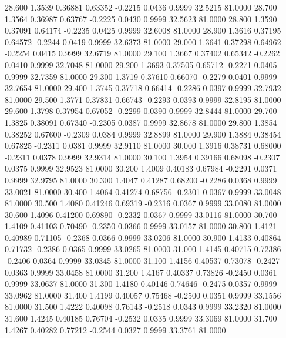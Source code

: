   28.600   1.3539   0.36881   0.63352  -0.2215   0.0436   0.9999  32.5215  81.0000
  28.700   1.3564   0.36987   0.63767  -0.2225   0.0430   0.9999  32.5623  81.0000
  28.800   1.3590   0.37091   0.64174  -0.2235   0.0425   0.9999  32.6008  81.0000
  28.900   1.3616   0.37195   0.64572  -0.2244   0.0419   0.9999  32.6373  81.0000
  29.000   1.3641   0.37298   0.64962  -0.2254   0.0415   0.9999  32.6719  81.0000
  29.100   1.3667   0.37402   0.65342  -0.2262   0.0410   0.9999  32.7048  81.0000
  29.200   1.3693   0.37505   0.65712  -0.2271   0.0405   0.9999  32.7359  81.0000
  29.300   1.3719   0.37610   0.66070  -0.2279   0.0401   0.9999  32.7654  81.0000
  29.400   1.3745   0.37718   0.66414  -0.2286   0.0397   0.9999  32.7932  81.0000
  29.500   1.3771   0.37831   0.66743  -0.2293   0.0393   0.9999  32.8195  81.0000
  29.600   1.3798   0.37954   0.67052  -0.2299   0.0390   0.9999  32.8444  81.0000
  29.700   1.3825   0.38091   0.67340  -0.2305   0.0387   0.9999  32.8678  81.0000
  29.800   1.3854   0.38252   0.67600  -0.2309   0.0384   0.9999  32.8899  81.0000
  29.900   1.3884   0.38454   0.67825  -0.2311   0.0381   0.9999  32.9110  81.0000
  30.000   1.3916   0.38731   0.68000  -0.2311   0.0378   0.9999  32.9314  81.0000
  30.100   1.3954   0.39166   0.68098  -0.2307   0.0375   0.9999  32.9523  81.0000
  30.200   1.4009   0.40183   0.67984  -0.2291   0.0371   0.9999  32.9795  81.0000
  30.300   1.4047   0.41287   0.68200  -0.2286   0.0368   0.9999  33.0021  81.0000
  30.400   1.4064   0.41274   0.68756  -0.2301   0.0367   0.9999  33.0048  81.0000
  30.500   1.4080   0.41246   0.69319  -0.2316   0.0367   0.9999  33.0080  81.0000
  30.600   1.4096   0.41200   0.69890  -0.2332   0.0367   0.9999  33.0116  81.0000
  30.700   1.4109   0.41103   0.70490  -0.2350   0.0366   0.9999  33.0157  81.0000
  30.800   1.4121   0.40989   0.71105  -0.2368   0.0366   0.9999  33.0206  81.0000
  30.900   1.4133   0.40864   0.71732  -0.2386   0.0365   0.9999  33.0265  81.0000
  31.000   1.4145   0.40715   0.72386  -0.2406   0.0364   0.9999  33.0345  81.0000
  31.100   1.4156   0.40537   0.73078  -0.2427   0.0363   0.9999  33.0458  81.0000
  31.200   1.4167   0.40337   0.73826  -0.2450   0.0361   0.9999  33.0637  81.0000
  31.300   1.4180   0.40146   0.74646  -0.2475   0.0357   0.9999  33.0962  81.0000
  31.400   1.4199   0.40057   0.75468  -0.2500   0.0351   0.9999  33.1556  81.0000
  31.500   1.4222   0.40098   0.76143  -0.2518   0.0343   0.9999  33.2320  81.0000
  31.600   1.4245   0.40185   0.76704  -0.2532   0.0335   0.9999  33.3069  81.0000
  31.700   1.4267   0.40282   0.77212  -0.2544   0.0327   0.9999  33.3761  81.0000
